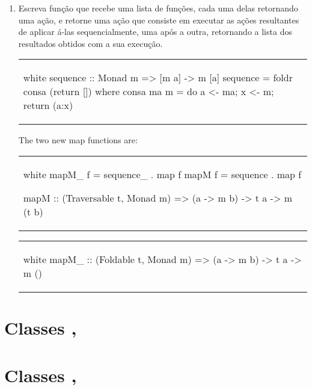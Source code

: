 \begin{enumerate}
\item Escreva função  que recebe uma lista de funções, cada
  uma delas retornando uma ação, e retorne uma ação que consiste em
  executar as ações resultantes de aplicar á-las sequencialmente, uma
  após a outra, retornando a lista dos resultados obtidos com a sua
  execução.

\begin{center}
\begin{tabular}{l}
\begin{alg}{.5\textwidth}{white}
sequence :: Monad m => [m a] -> m [a]
sequence = foldr consa (return [])
  where consa ma m = do {a <- ma; x <- m; return (a:x)}
\end{alg}
\end{tabular}
\end{center}
The two new map functions are:

\begin{center}
\begin{tabular}{l}
\begin{alg}{.5\textwidth}{white}
mapM_ f = sequence_ . map f
mapM f = sequence . map f

mapM :: (Traversable t, Monad m) => (a -> m b) -> t a -> m (t b)
\end{alg}
\end{tabular}
\end{center}


\begin{center}
\begin{tabular}{l}
\begin{alg}{.5\textwidth}{white}
mapM_ :: (Foldable t, Monad m) => (a -> m b) -> t a -> m ()
\end{alg}
\end{tabular}
\end{center}

\end{enumerate}

\section{Classes , }
\label{Foldable-Traversable}

\section{Classes , }
\label{Applicative}


